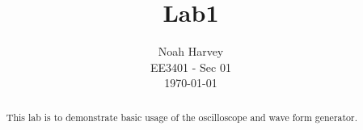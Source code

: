 \documentclass[a4paper,titlepage,conference]{IEEEtran}
\begin{document}
\title{Lab1}
\author{Noah Harvey
	\\ EE3401 - Sec 01
	\\ \today
}

\maketitle

\begin{abstract}
This lab is to demonstrate basic usage of the oscilloscope and wave form
generator.	
\end{abstract}


\end{document}
